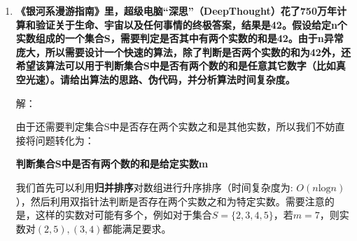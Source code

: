 \documentclass[UTF8,12pt,a4paper]{ctexart}
\begin{document}
\begin{enumerate}[1.]
	我们只会扫描数组A，而且我们每次循环，都能排除掉一半数，也就是说，每一次处理的数据规模是上一次的二分之一，但是我们中间的操作只涉及有限次的比较操作，时间复杂度是常数级别的。所以，该算法的递归方程是：
	\begin{equation}
		T(m) = T(m/2) + O(1)
		\label{eq:T1}
	\end{equation}
	解得：
	\begin{equation}
		T(n) = O(\text{log}m) = O(\text{log}(m + n))
	\end{equation}

	算法伪代码：
	\begin{algorithm}[H]
		\caption{Find Median of Two Sorted Arrays}
		\begin{algorithmic}[1]
		\Require Two sorted arrays $A[0 \dots m-1]$ and $B[0 \dots n-1]$
		\Ensure The median of the combined sorted array of $A$ and $B$
	
		\State Initialize $\text{left} \gets 0$, $\text{right} \gets m$, $\text{Half} \gets \lfloor (m + n + 1)/2 \rfloor$
			\State $i \gets \lfloor (\text{left} + \text{right})/2 \rfloor$, $j \gets \text{Half} - i$
					\State  return max\{$B[j-1]$, $A[i-1]$\}
				\Else
					\State return $(B[j-1]+A[i-1])/2$
				\EndIf
				\State left = $i + 1$
			\Else
				\State right = $i - 1$
			\EndIf
		\EndWhile
		\end{algorithmic}
		\end{algorithm}
		
	
	\item \textbf{《银河系漫游指南》里，超级电脑“深思”（DeepThought）花了750万年计算和验证关于生命、宇宙以及任何事情的终极答案，结果是42。假设给定n个实数组成的一个集合S，需要判定是否其中有两个实数的和是42。由于n异常庞大，所以需要设计一个快速的算法，除了判断是否两个实数的和为42外，还希望该算法可以用于判断集合S中是否有两个数的和是任意其它数字（比如真空光速）。请给出算法的思路、伪代码，并分析算法时间复杂度。}

	解：

	由于还需要判定集合S中是否存在两个实数之和是其他实数，所以我们不妨直接将问题转化为：

	\textbf{判断集合S中是否有两个数的和是给定实数m}

	我们首先可以利用\textbf{归并排序}对数组进行升序排序（时间复杂度为: $O(n\text{log}n)$），然后利用双指针法判断是否存在两个实数之和为特定实数。需要注意的是，这样的实数对可能有多个，例如对于集合$S=\{2,3,4,5\}$，若$m=7$，则实数对$(2,5), (3,4)$都能满足要求。


\end{enumerate}
\end{document}

